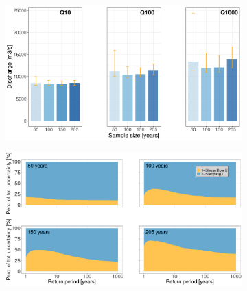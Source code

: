 \documentclass[11pt]{article}
\begin{document}
        \begin{figure}[h!]
            \centering
            \begin{subfigure}{0.49\linewidth}
                \centering
                \includegraphics[width=1\linewidth]{Figs/11a-BarplotQuantiles4cases.pdf}
                \caption{}
                \label{subfig:Form4cases}
            \end{subfigure}
            \begin{subfigure}{.49\textwidth}
                \centering  
                \includegraphics[width=\linewidth]{Figs/11b-Ukplot4cases.pdf}
                \caption{}
                \label{subfig:BarplotQuantilesGev}
            \end{subfigure}
            

\end{figure}
\end{document}
